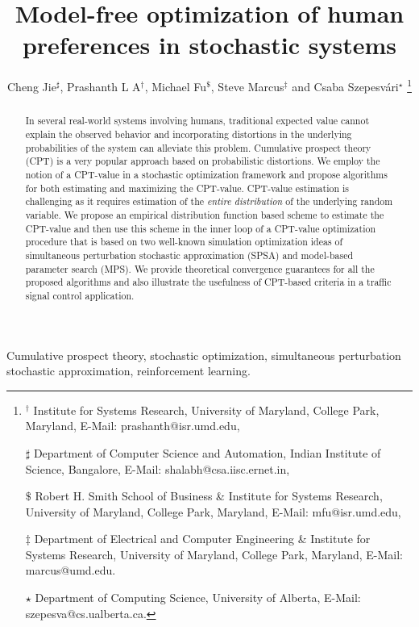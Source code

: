 \documentclass[twocolumn]{IEEEtran}
\begin{document}
\title{Model-free optimization of human preferences in stochastic systems}
\author{Cheng Jie$^\sharp$, Prashanth L A$^\dagger$, Michael Fu$^\$$, Steve Marcus$^\ddag$ and Csaba Szepesv\'ari$^\star$
\thanks{
$^\dagger$ Institute for Systems Research, University of Maryland, College Park, Maryland,
E-Mail: prashanth@isr.umd.edu,

$\sharp$ Department of Computer Science and Automation,
Indian Institute of Science, Bangalore,
E-Mail: shalabh@csa.iisc.ernet.in, 

$\$$ Robert H. Smith School of Business \& Institute for Systems Research,
University of Maryland, College Park, Maryland,
E-Mail: mfu@isr.umd.edu,

$\ddag$ Department of Electrical and Computer Engineering \& Institute for Systems Research,
University of Maryland, College Park, Maryland,
 E-Mail: marcus@umd.edu.

$\star$ Department of Computing Science,
University of Alberta,
 E-Mail: szepesva@cs.ualberta.ca.
}}
\maketitle


\begin{abstract}
In several real-world systems involving humans, traditional expected value cannot explain the observed behavior and incorporating distortions in the underlying probabilities of the system can alleviate this problem. Cumulative prospect theory (CPT) is a very popular approach based on probabilistic distortions.
We employ the notion of a CPT-value in a stochastic optimization framework and propose algorithms for both estimating and maximizing the CPT-value.
CPT-value estimation is challenging as it requires estimation of the {\it entire distribution} of the underlying random variable.
We propose an empirical distribution function based scheme to estimate the CPT-value and then use this scheme in the inner loop of a CPT-value optimization procedure that is based on two well-known simulation optimization ideas of simultaneous perturbation stochastic approximation (SPSA) and model-based parameter search (MPS).
We provide theoretical convergence guarantees for all the proposed algorithms and also 
illustrate the usefulness of CPT-based criteria in a traffic signal control application.
\end{abstract}

\begin{IEEEkeywords}
Cumulative prospect theory, stochastic optimization, simultaneous perturbation stochastic approximation, reinforcement learning.
\end{IEEEkeywords}
\end{document}

